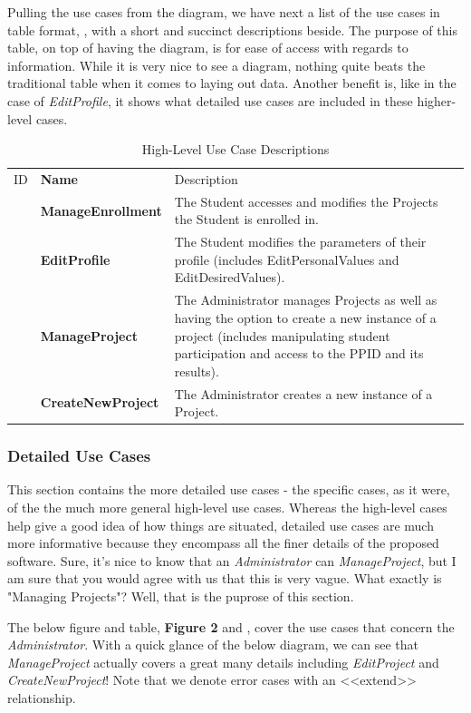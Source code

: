 \documentclass[12pt,letterpaper]{article}
\begin{document}
Pulling the use cases from the diagram, we have next a list of the use cases in table format, , with a short and succinct descriptions beside. The purpose of this table,
on top of having the diagram, is for ease of access with regards to information. While it is very nice to see a diagram, nothing quite beats the traditional table when
it comes to laying out data. Another benefit is, like in the case of {\it EditProfile}, it shows what detailed use cases are included in these higher-level cases.

\begin{table}[H]
	\caption{High-Level Use Case Descriptions}
	\begin{tabu} to 
	    \tableheader{}ID & Name & Description\\
	    \manageenrollment{} & ManageEnrollment & The Student accesses and modifies the Projects the Student is enrolled in.\\
		\editprofile{} & EditProfile & The Student modifies the parameters of their profile (includes EditPersonalValues and EditDesiredValues).\\
		\manageproject{} & ManageProject & The Administrator manages Projects as well as having the option to create a new instance of a project (includes manipulating student participation and access to the PPID and its results).\\
		\createnewproject{} & CreateNewProject & The Administrator creates a new instance of a Project.\\
	\end{tabu}
\end{table}

\subsubsection*{Detailed Use Cases}

This section contains the more detailed use cases - the specific cases, as it were, of the the much more general high-level use cases. Whereas the high-level cases help give a good
idea of how things are situated, detailed use cases are much more informative because they encompass all the finer details of the proposed software. Sure, it's nice to know that
an {\it Administrator} can {\it ManageProject}, but I am sure that you would agree with us that this is very vague. What exactly is "Managing Projects"? Well, that is the puprose of this 
section. 

The below figure and table, {\bf Figure 2} and , cover the use cases that concern the {\it Administrator}. With a quick glance of the below diagram, we can see that {\it ManageProject} actually covers a 
great many details including {\it EditProject} and {\it CreateNewProject}! Note that we denote error cases with an <<extend>> relationship.
\end{document}
